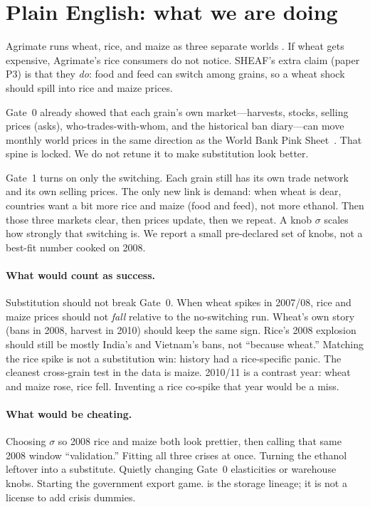 \section{Plain English: what we are doing}
\label{sec:plain}

Agrimate runs wheat, rice, and maize as three separate worlds
\citep{kuhla2025}. If wheat gets expensive, Agrimate's rice consumers do
not notice. SHEAF's extra claim (paper P3) is that they \emph{do}: food and
feed can switch among grains, so a wheat shock should spill into rice and
maize prices.

Gate~0 already showed that each grain's own market---harvests, stocks,
selling prices (asks), who-trades-with-whom, and the historical ban
diary---can move monthly world prices in the same direction as the World
Bank Pink Sheet~\citep{worldbank_pink,amis_oecd}. That spine is locked.
We do not retune it to make substitution look better.

Gate~1 turns on only the switching. Each grain still has its own trade
network and its own selling prices. The only new link is demand: when
wheat is dear, countries want a bit more rice and maize (food and feed),
not more ethanol. Then those three markets clear, then prices update, then
we repeat. A knob \(\sigma\) scales how strongly that switching is. We
report a small pre-declared set of knobs, not a best-fit number cooked on
2008.

\paragraph{What would count as success.}
Substitution should not break Gate~0. When wheat spikes in 2007/08, rice
and maize prices should not \emph{fall} relative to the no-switching run.
Wheat's own story (bans in 2008, harvest in 2010) should keep the same
sign. Rice's 2008 explosion should still be mostly India's and Vietnam's
bans, not ``because wheat.'' Matching the rice spike is not a substitution
win: history had a rice-specific panic. The cleanest cross-grain test in
the data is maize. 2010/11 is a contrast year: wheat and maize rose, rice
fell. Inventing a rice co-spike that year would be a miss.

\paragraph{What would be cheating.}
Choosing \(\sigma\) so 2008 rice and maize both look prettier, then calling
that same 2008 window ``validation.'' Fitting all three crises at once.
Turning the ethanol leftover into a substitute. Quietly changing Gate~0
elasticities or warehouse knobs. Starting the government export game.
\citep{schewe2017} is the storage lineage; it is not a license to add
crisis dummies.
